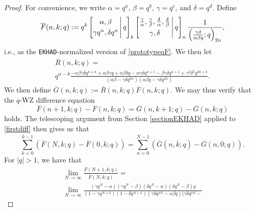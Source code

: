 \documentclass[10pt,a4paper]{amsart}
\begin{document}
\begin{proof}
 For convenience, we write $\alpha = q^a$, $\beta = q^b$, $\gamma = q^c$,  and $\delta = q^d$.  Define  $$ \overline{F}(n, k; q) :=  
 q^{k} \left[ \begin{matrix} 
 \alpha, \beta \vspace{1mm} \\ 
 \gamma q^{n}, \delta q^{n} \end{matrix} \, \Bigg| \, q \right]_{k} 
 \left[ \begin{matrix} 
 \frac{\gamma}{\alpha}, \frac{\gamma}{\beta}, \frac{\delta}{\alpha}, \frac{\delta}{\beta} \vspace{1mm} \\ 
 \gamma, \delta \end{matrix} \, \Bigg| \, q \right]_{n} \frac{1}{ \left( \frac{\gamma \delta}{\alpha \beta q}; q \right)_{2n} },  $$  i.e., as the 
 {\tt EKHAD}-normalized version of \eqref{prototypeqF}. We then let 
\begin{multline*}
 \overline{R}(n, k; q) = \\ q^{n-k} \frac{ -\alpha \beta \gamma \delta q^{k+n} + \alpha \beta \gamma 
 q + \alpha \beta \delta q - \alpha \gamma \delta q^{n+1} - \beta \gamma \delta q^{n+1} 
 + \gamma^{2} \delta^{2} q^{3n+k} }{(\alpha \beta - \gamma \delta q^{2n}) (\alpha \beta q - \gamma \delta q^{2n})}. 
\end{multline*}
 We then define 
 $\overline{G}(n, k; q) := \overline{R}(n, k; q) \overline{F}(n, k; q)$. We may thus verify that 
 the $q$-WZ difference equation 
\begin{equation}\label{firstdiff}
 \overline{F}(n+1, k; q) - \overline{F}(n, k; q) = \overline{G}(n, k+1; q) - \overline{G}(n, k; q) 
\end{equation}
 holds. The telescoping argument from Section \ref{sectionEKHAD}
 applied to \eqref{firstdiff} then 
 gives us that 
\begin{equation}\label{kbarN}
 \sum_{k=0}^{\overline{k} - 1} \left( \overline{F}(N,k;q) - \overline{F}(0,k;q) \right) 
 = \sum_{n=0}^{N-1} \left( \overline{G}(n,\overline{k};q) - \overline{G}(n,0;q) \right). 
\end{equation}
 For $|q| > 1$, we have that 
\begin{multline*}
 \lim_{N \to \infty} \frac{ \overline{F}(N+1,k;q) }{\overline{F}(N,k;q)} 
 = \\
 \lim_{N \to \infty} \frac{ (\gamma q^{N} - \alpha) (\gamma q^{N} - \beta) (\delta q^{N} - \alpha) (\delta q^{N} - 
 \beta) 
 q }{ (1 - \gamma q^{N+k}) (1 - \delta q^{N + k}) (\gamma \delta q^{2N} - \alpha \beta q) (\gamma \delta q^{2N} - 
}
\end{multline*}
\end{proof}
\end{document}
